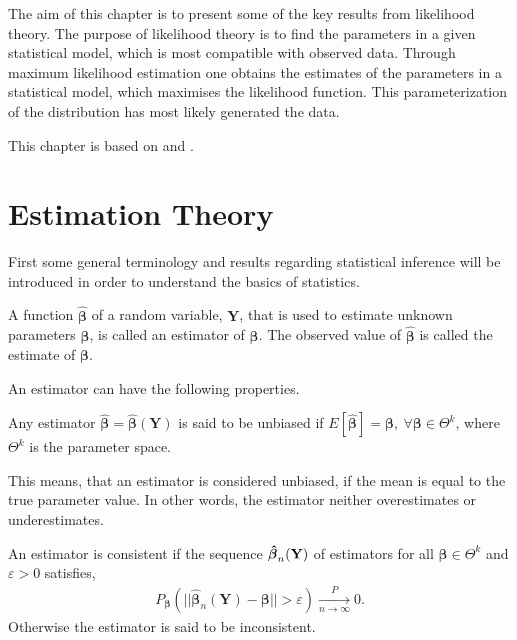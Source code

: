 The aim of this chapter is to present some of the key results from likelihood theory. 
The purpose of likelihood theory is to find the parameters in a given statistical model, which is most compatible with observed data. 
Through maximum likelihood estimation one obtains the estimates of the parameters in a statistical model, which maximises the likelihood function. 
This parameterization of the distribution has most likely generated the data.

This chapter is based on \cite{MadsenThyregod2011} and \cite{Rasmussen2019}.

\section{Estimation Theory}
First some general terminology and results regarding statistical inference will be introduced in order to understand the basics of statistics.

\begin{definition} 
    A function $\boldsymbol{\hat{\beta}}$ of a random variable, $\textbf{Y}$, that is used to estimate unknown parameters $\boldsymbol{\beta}$, is called an estimator of $\boldsymbol{\beta}$. The observed value of $\boldsymbol{\hat{\beta}}$ is called the estimate of $\boldsymbol{\beta}$.
\end{definition}

An estimator can have the following properties. 

\begin{definition}
\label{def:Unbiased_estmator}
Any estimator $\boldsymbol{\hat{\beta}} = \boldsymbol{\hat{\beta}}(\textbf{Y})$ is said to be unbiased if $E[\boldsymbol{\hat{\beta}}] = \boldsymbol{\beta}, \ \forall \boldsymbol{\beta} \in \Theta^k$, where $\Theta^k$ is the parameter space.
\end{definition}

This means, that an estimator is considered unbiased, if the mean is equal to the true parameter value. 
In other words, the estimator neither overestimates or underestimates.

\begin{definition} 
\label{def:consistent_estimator}
An estimator is consistent if the sequence $\operatorname{\boldsymbol{\hat{\beta}}}_n(\textbf{Y})$ of estimators for all $\boldsymbol{\beta} \in \Theta^k$ and $\varepsilon > 0$ satisfies,
\begin{align*}
    P_{\boldsymbol{\beta}}(||\hat{\boldsymbol{\beta}}_n(\textbf{Y}) - \boldsymbol{\beta}|| > \varepsilon) \xrightarrow[n \rightarrow \infty]{P} 0.
\end{align*}
Otherwise the estimator is said to be inconsistent.
\end{definition}

